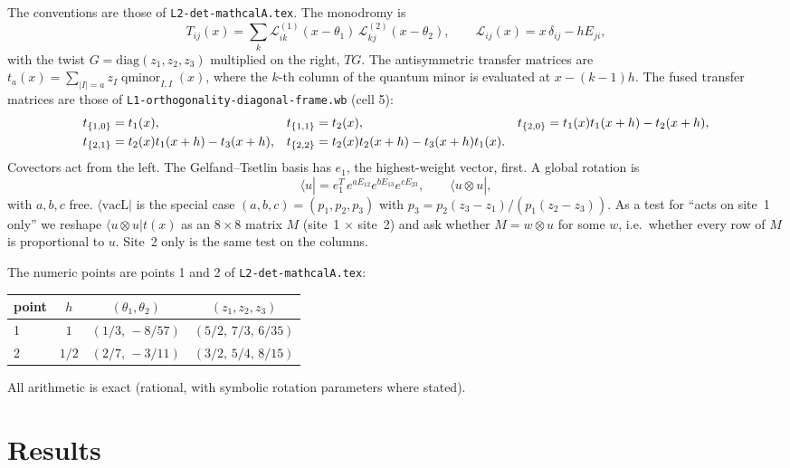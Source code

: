 \documentclass[11pt]{article}
\newcommand{\vacL}{\langle\mathrm{vacL}|}
\newcommand{\nb}[1]{\texttt{#1}}
\theoremstyle{definition}
\theoremstyle{remark}
\begin{document}
The conventions are those of \nb{L2-det-mathcalA.tex}. The monodromy is
\begin{equation}
T_{ij}(x)=\sum_k\mathcal L^{(1)}_{ik}(x-\theta_1)\,\mathcal L^{(2)}_{kj}(x-\theta_2),\qquad \mathcal L_{ij}(x)=x\,\delta_{ij}-hE_{ji},
\end{equation}
with the twist $G=\mathrm{diag}(z_1,z_2,z_3)$ multiplied on the right, $TG$. The antisymmetric transfer matrices are $t_a(x)=\sum_{|I|=a}z_I\operatorname{qminor}_{I,I}(x)$, where the $k$-th column of the quantum minor is evaluated at $x-(k-1)h$. The fused transfer matrices are those of \nb{L1-orthogonality-diagonal-frame.wb} (cell 5):
\begin{align}
t_{\{1,0\}}&=t_1(x), & t_{\{1,1\}}&=t_2(x), & t_{\{2,0\}}&=t_1(x)t_1(x+h)-t_2(x+h),\notag\\
t_{\{2,1\}}&=t_2(x)t_1(x+h)-t_3(x+h), & t_{\{2,2\}}&=t_2(x)t_2(x+h)-t_3(x+h)t_1(x). &&
\end{align}
Covectors act from the left. The Gelfand--Tsetlin basis has $e_1$, the highest-weight vector, first. A global rotation is
\begin{equation}
\langle u|=e_1^T\,e^{aE_{12}}e^{bE_{13}}e^{cE_{23}},\qquad \langle u\otimes u|,
\end{equation}
with $a,b,c$ free. $\vacL$ is the special case $(a,b,c)=(p_1,p_2,p_3)$ with $p_3=p_2(z_3-z_1)/(p_1(z_2-z_3))$. As a test for ``acts on site~1 only'' we reshape $\langle u\otimes u|t(x)$ as an $8\times8$ matrix $M$ (site~1 $\times$ site~2) and ask whether $M=w\otimes u$ for some $w$, i.e.\ whether every row of $M$ is proportional to $u$. Site~2 only is the same test on the columns.

The numeric points are points 1 and 2 of \nb{L2-det-mathcalA.tex}:
\begin{center}
\begin{tabular}{lccc}\toprule
point & $h$ & $(\theta_1,\theta_2)$ & $(z_1,z_2,z_3)$\\\midrule
1 & $1$ & $(1/3,\,-8/57)$ & $(5/2,\,7/3,\,6/35)$\\
2 & $1/2$ & $(2/7,\,-3/11)$ & $(3/2,\,5/4,\,8/15)$\\\bottomrule
\end{tabular}
\end{center}
All arithmetic is exact (rational, with symbolic rotation parameters where stated).

\section{Results}
\end{document}

